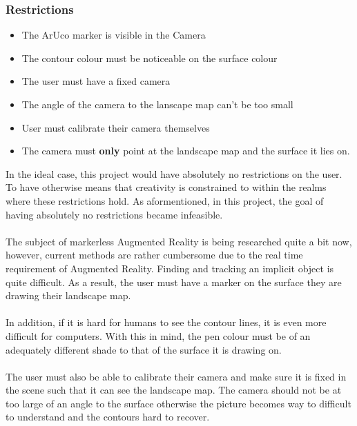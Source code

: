 \documentclass[11pt]{article}
\begin{document}
\subsubsection{Restrictions}
\begin{itemize}
    \item The ArUco marker is visible in the Camera
    \item The contour colour must be noticeable on the surface colour
    \item The user must have a fixed camera
    \item The angle of the camera to the lanscape map can't be too small
   	\item User must calibrate their camera themselves
   	\item The camera must \textbf{only} point at the landscape map and the
   			surface it lies on.        
\end{itemize}

In the ideal case, this project would have absolutely no restrictions 
on the user. To have otherwise means that creativity is constrained
to within the realms where these restrictions hold. As 
aformentioned, in this project, the goal of having absolutely no restrictions 
became infeasible. \\
\\
The subject of markerless Augmented Reality 
is being researched quite a bit now, however, current methods are rather 
cumbersome due to the real time requirement of Augmented Reality. Finding
and tracking an implicit object is quite difficult. As
a result, the user must have a marker on the surface they are drawing their
landscape map. \\
\\
In addition, if it is hard for humans to see the contour
lines, it is even more difficult for computers. With this in mind, 
the pen colour must
be of an adequately different shade to that of the surface it is drawing on.\\
\\
The user must also be able to calibrate their camera and make sure it
is fixed in the scene such that it can see the landscape map. The camera should
not be at too large of an angle to the surface otherwise 
the picture becomes way to difficult to understand and the contours hard
to recover.
\end{document}
